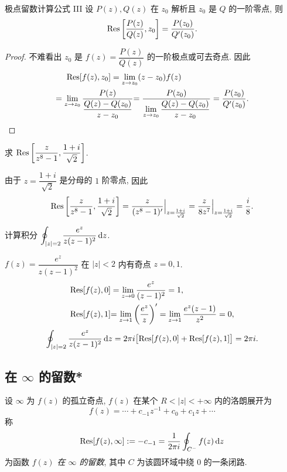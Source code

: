 \begin{alertblock}{极点留数计算公式 III}
	设 $P(z),Q(z)$ 在 $z_0$ 解析且 $z_0$ 是 $Q$ 的一阶零点, 则
	\[{\mathrm{Res}}\left[\frac{P(z)}{Q(z)},z_0\right]=\frac{P(z_0)}{Q'(z_0)}.\]
\end{alertblock}

\begin{proof}
		不难看出 $z_0$ 是 $f(z)=\dfrac{P(z)}{Q(z)}$ 的一阶极点或可去奇点.
	{因此
		\begin{align*}
			&\peq\Res[f(z),z_0]=\lim_{z\to z_0}(z-z_0)f(z)\\
			&{=\lim_{z\to z_0}\frac{P(z)}{\dfrac{Q(z)-Q(z_0)}{z-z_0}}}
			{=\frac{P(z_0)}{\lim\limits_{z\to z_0}\dfrac{Q(z)-Q(z_0)}{z-z_0}}=\frac{P(z_0)}{Q'(z_0)}.\qedhere}
		\end{align*}
	}
\end{proof}

\begin{example}
	求 ${\mathrm{Res}}\left[\dfrac{z}{z^8-1},\dfrac{1+i}{\sqrt2}\right]$.
\end{example}

\begin{solution}
		由于 $z=\dfrac{1+i}{\sqrt2}$ 是分母的 $1$ 阶零点,
	{因此
		\[{\mathrm{Res}}\left[\frac z{z^8-1},\frac{1+i}{\sqrt2}\right]
		=\frac z{(z^8-1)'}\Big|_{z=\frac{1+i}{\sqrt2}}
		=\frac z{8z^7}\Big|_{z=\frac{1+i}{\sqrt2}}
		=\frac i8.\]
	}
\end{solution}


\begin{example}
	计算积分 $\displaystyle\oint_{|z|=2}\frac{e^z}{z(z-1)^2}\,\mathrm{d} z$.
\end{example}

\begin{solution}
		$f(z)=\dfrac{e^z}{z(z-1)^2}$ 在 $|z|<2$ 内有奇点 $z=0,1$.
	{\begin{align*}
		{\mathrm{Res}}[f(z),0]&=\lim_{z\to0}\frac{e^z}{(z-1)^2}=1,\\
		{{\mathrm{Res}}[f(z),1]}&{=\lim_{z\to1}\left(\frac{e^z}z\right)'=\lim_{z\to1}\frac{e^z(z-1)}{z^2}=0,}
	\end{align*}\[\oint_{|z|=2}\frac{e^z}{z(z-1)^2}\,\mathrm{d} z
		=2\pi i\bigl[{\mathrm{Res}}[f(z),0]+{\mathrm{Res}}[f(z),1]\bigr]
		=2\pi i.\]
	}
\end{solution}

\subsection{在 \texorpdfstring{$\infty$}{∞} 的留数*}

\begin{definition}
	设 $\infty$ 为 $f(z)$ 的孤立奇点, $f(z)$ 在某个 $R<|z|<+\infty$ 内的洛朗展开为
	\[f(z)=\cdots+c_{-1}z^{-1}+c_0+c_1z+\cdots\]
	称
	\[{\mathrm{Res}}[f(z),\infty]:=-c_{-1}=\frac1{2\pi i}\oint_{C^-}f(z)\,\mathrm{d} z\]
	为函数 \emph{$f(z)$ 在 $\infty$ 的留数}, 其中 $C$ 为该圆环域中绕 $0$ 的一条闭路.
\end{definition}

